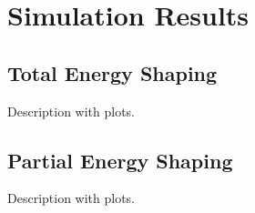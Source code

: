 \documentclass[main.tex]{subfiles}
\begin{document}
\section{Simulation Results}
\label{sec:simulation-results}
\subsection{Total Energy Shaping}
Description with plots.
\subsection{Partial Energy Shaping}
Description with plots.
\end{document}
